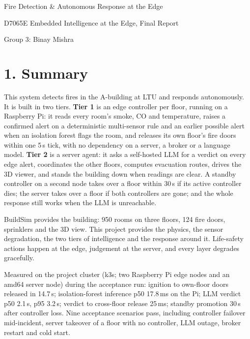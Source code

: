 \documentclass[11pt]{article}
\begin{document}
\begin{center}
{\LARGE Fire Detection \& Autonomous Response at the Edge\par}
\vspace{0.5em}
{\large D7065E Embedded Intelligence at the Edge, Final Report\par}
\vspace{1em}
{Group 3: Binay Mishra\par}
\end{center}

\vspace{1.2em}

{
\hypersetup{linkcolor=black}
\setcounter{tocdepth}{3}
\tableofcontents
}

\newpage

\section{1. Summary}

This system detects fires in the A-building at LTU and responds autonomously. It is built in two tiers.
\textbf{Tier 1} is an edge controller per floor, running on a Raspberry Pi: it reads every room's smoke, CO and temperature,
raises a confirmed alert on a deterministic multi-sensor rule and an earlier possible alert when an isolation forest
flags the room, and releases its own floor's fire doors within one 5\,s tick, with no dependency on a server, a broker or
a language model. \textbf{Tier 2} is a server agent: it asks a self-hosted LLM for a verdict on every edge alert,
coordinates the other floors, computes evacuation routes, drives the 3D viewer, and stands the building down when
readings are clear. A standby controller on a second node takes over a floor within 30\,s if its active controller dies;
the server takes over a floor if both controllers are gone; and the whole response still works when the LLM is unreachable.

BuildSim provides the building: 950 rooms on three floors, 124 fire doors, sprinklers and the 3D view.
This project provides the physics, the sensor degradation, the two tiers of intelligence and the response around it.
Life-safety actions happen at the edge, judgement at the server, and every layer degrades gracefully.

Measured on the project cluster (k3s; two Raspberry Pi edge nodes and an amd64 server node)
during the acceptance run: ignition to own-floor doors released in 14.7\,s; isolation-forest inference p50 17.8\,ms on the Pi;
LLM verdict p50 2.1\,s, p95 3.2\,s; verdict to cross-floor release 25\,ms; standby promotion 30\,s after controller loss.
Nine acceptance scenarios pass, including controller failover mid-incident, server takeover of a floor with no controller,
LLM outage, broker restart and cold start.
\end{document}
